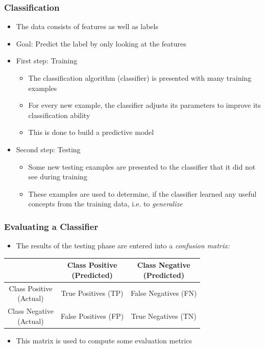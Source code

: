 \begin{frame}
  \frametitle{Classification}
  \begin{itemize}
    \item The data consists of features as well as labels
    \item Goal: Predict the label by only looking at the features
    \item First step: Training
      \begin{itemize}
        \item The classification algorithm (classifier) is presented
          with many training examples
        \item For every new example, the classifier adjusts its
          parameters to improve its classification ability
        \item This is done to build a predictive model
      \end{itemize}
    \item Second step: Testing
      \begin{itemize}
        \item Some new testing examples are presented to the
          classifier that it did not see during training
        \item These examples are used to determine, if the classifier
          learned any useful concepts from the training data, i.e. to
          \textit{generalize}
      \end{itemize}
  \end{itemize}
\end{frame}

\begin{frame}
  \frametitle{Evaluating a Classifier}
  \begin{itemize}
    \item The results of the testing phase are entered into a
      \textit{confusion matrix:}
  \end{itemize}
  \begin{table}[h]
  \centering
  \renewcommand\theadfont{\bfseries}
  \begin{tabular}{|c|c|c|}
    \hline
    & \thead{Class Positive\\(Predicted)} & \thead{Class Negative\\(Predicted)} \\
    \hline
    \thead{Class Positive\\(Actual)} & True Positives (TP) & False
    Negatives (FN) \\
    \hline
    \thead{Class Negative\\(Actual)} & False Positives (FP) & True
    Negatives (TN) \\
    \hline
  \end{tabular}
  \end{table}
  \begin{itemize}
    \item This matrix is used to compute some evaluation metrics
  \end{itemize}
\end{frame}

